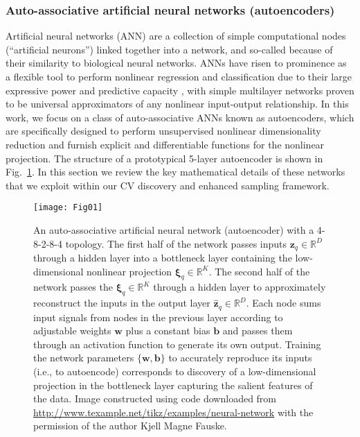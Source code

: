 \documentclass[12pt]{article}
\newcommand*{\blauw}[1]{#1}
\newcommand*{\groen}[1]{#1}
\newcommand*{\blauwr}[1]{#1}
\begin{document}
\subsubsection{\sffamily \normalsize Auto-associative artificial neural networks (autoencoders)} \label{AE}

Artificial neural networks (\groen{ANN}) are a collection of simple computational nodes (``artificial neurons'') linked together into a network\cite{hassoun1995fundamentals}, and so-called because of their similarity to biological neural networks. ANNs have risen to prominence as a flexible tool to perform nonlinear regression and classification due to their large expressive power and predictive capacity \cite{mcculloch1943logical}, with simple multilayer networks proven to be universal approximators of any nonlinear input-output relationship\cite{hassoun1995fundamentals,chen1995universal}. In this work, we focus on a class of auto-associative ANNs known as autoencoders, which are specifically designed to perform unsupervised nonlinear dimensionality reduction and furnish explicit and differentiable functions for the nonlinear projection\cite{scholz2008nonlinear,kramer1991nonlinear,kirby1996circular}. The structure of a prototypical 5-layer autoencoder is shown in \blauw{Fig.~\ref{autoencoder}}. \blauwr{In this section we review the key mathematical details of these networks that we exploit within our CV discovery and enhanced sampling framework.} 

\begin{figure}[ht!]
\begin{center}
\texttt{[image: Fig01]}
\caption{An auto-associative artificial neural network (autoencoder) with a 4-8-2-8-4 topology. The first half of the network passes inputs $\mathbf{z}_q \in \mathbb{R}^D$ through a hidden layer into a bottleneck layer containing the low-dimensional nonlinear projection $\boldsymbol\xi_q \in \mathbb{R}^K$. The second half of the network passes the $\boldsymbol\xi_q \in \mathbb{R}^K$ through a hidden layer to approximately reconstruct the inputs in the output layer $\hat{\mathbf{z}}_q \in \mathbb{R}^D$. Each node sums input signals from nodes in the previous layer according to adjustable weights $\mathbf{w}$ plus a constant bias $\mathbf{b}$ and passes them through an activation function to generate its own output. Training the network parameters $\{\mathbf{w},\mathbf{b}\}$ to accurately reproduce its inputs (i.e., to autoencode) corresponds to discovery of a low-dimensional projection in the bottleneck layer capturing the salient features of the data. Image constructed using code downloaded from \url{http://www.texample.net/tikz/examples/neural-network} with the permission of the author Kjell Magne Fauske.} \label{autoencoder}
\end{center}
\end{figure}
\end{document}

